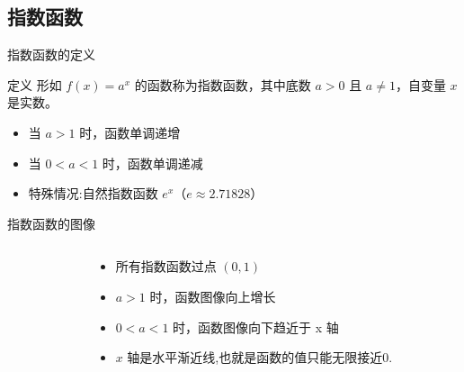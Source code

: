\subsection{指数函数}
\begin{frame}{指数函数的定义}
    \begin{block}{定义}
        形如 \( f(x) = a^x \) 的函数称为指数函数，其中底数 \( a > 0 \) 且 \( a \neq 1 \)，自变量 \( x \) 是实数。
    \end{block}
    
    \begin{itemize}
        \item 当 \( a > 1 \) 时，函数单调递增
        \item 当 \( 0 < a < 1 \) 时，函数单调递减
        \item 特殊情况:自然指数函数 \( e^x \)（\( e \approx 2.71828 \)）
    \end{itemize}
  \end{frame}
  
  
  
  \begin{frame}{指数函数的图像}
    \begin{columns}
        \begin{column}{0.5\textwidth}
        \end{column}
        \begin{column}{0.5\textwidth}
            \begin{itemize}
                \item 所有指数函数过点 \((0,1)\)
                \item \( a > 1 \) 时，函数图像向上增长
                \item \( 0 < a < 1 \) 时，函数图像向下趋近于 x 轴
                \item $x$ 轴是水平渐近线,也就是函数的值只能无限接近$0$.
            \end{itemize}
        \end{column}
    \end{columns}
  \end{frame}
  
